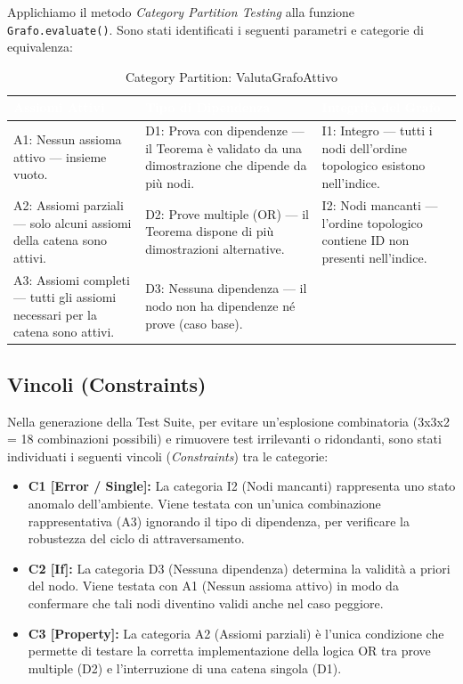 \documentclass[12pt,a4paper]{article}
\begin{document}
Applichiamo il metodo \textit{Category Partition Testing} alla funzione \texttt{Grafo.evaluate()}. Sono stati identificati i seguenti parametri e categorie di equivalenza:

\begin{table}[H]
    \centering
    \small
    \begin{tabularx}{\textwidth}{|X|X|X|}
        \hline
        \rowcolor{PrimaryBlue} \textcolor{white}{\textbf{Assiomi Attivi}} & \textcolor{white}{\textbf{Tipo di Dipendenza}} & \textcolor{white}{\textbf{Integrità del Grafo}} \\
        \hline
        A1: Nessun assioma attivo — insieme vuoto. & D1: Prova con dipendenze — il Teorema è validato da una dimostrazione che dipende da più nodi. & I1: Integro — tutti i nodi dell'ordine topologico esistono nell'indice. \\
        \hline
        \rowcolor{CodeBg} A2: Assiomi parziali — solo alcuni assiomi della catena sono attivi. & D2: Prove multiple (OR) — il Teorema dispone di più dimostrazioni alternative. & I2: Nodi mancanti — l'ordine topologico contiene ID non presenti nell'indice. \\
        \hline
        A3: Assiomi completi — tutti gli assiomi necessari per la catena sono attivi. & D3: Nessuna dipendenza — il nodo non ha dipendenze né prove (caso base). & \\
        \hline
    \end{tabularx}
    \caption{Category Partition: ValutaGrafoAttivo}
\end{table}

\subsection{Vincoli (Constraints)}
Nella generazione della Test Suite, per evitare un'esplosione combinatoria (3x3x2 = 18 combinazioni possibili) e rimuovere test irrilevanti o ridondanti, sono stati individuati i seguenti vincoli (\textit{Constraints}) tra le categorie:

\begin{itemize}
    \item \textbf{C1 [Error / Single]:} La categoria I2 (Nodi mancanti) rappresenta uno stato anomalo dell'ambiente. Viene testata con un'unica combinazione rappresentativa (A3) ignorando il tipo di dipendenza, per verificare la robustezza del ciclo di attraversamento.
    \item \textbf{C2 [If]:} La categoria D3 (Nessuna dipendenza) determina la validità a priori del nodo. Viene testata con A1 (Nessun assioma attivo) in modo da confermare che tali nodi diventino validi anche nel caso peggiore.
    \item \textbf{C3 [Property]:} La categoria A2 (Assiomi parziali) è l'unica condizione che permette di testare la corretta implementazione della logica OR tra prove multiple (D2) e l'interruzione di una catena singola (D1).
\end{itemize}
\end{document}
